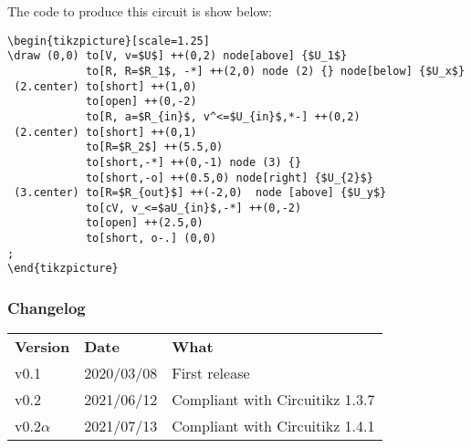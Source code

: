 \documentclass[12pt]{article}
\begin{document}
The code to produce this circuit is show below:

\begin{lstlisting}
\begin{tikzpicture}[scale=1.25]
\draw (0,0) to[V, v=$U$] ++(0,2) node[above] {$U_1$}
            to[R, R=$R_1$, -*] ++(2,0) node (2) {} node[below] {$U_x$}
 (2.center) to[short] ++(1,0)
            to[open] ++(0,-2)
            to[R, a=$R_{in}$, v^<=$U_{in}$,*-] ++(0,2) 
 (2.center) to[short] ++(0,1)
            to[R=$R_2$] ++(5.5,0)
            to[short,-*] ++(0,-1) node (3) {}
			to[short,-o] ++(0.5,0) node[right] {$U_{2}$}
 (3.center) to[R=$R_{out}$] ++(-2,0)  node [above] {$U_y$}
            to[cV, v_<=$aU_{in}$,-*] ++(0,-2)
			to[open] ++(2.5,0)
            to[short, o-.] (0,0)
;
\end{tikzpicture}
\end{lstlisting}
\subsubsection*{Changelog}

\begin{table}[!ht]
\begin{tabular}{lll}
\textbf{Version} & \textbf{Date} & \textbf{What} \\
v0.1    & 2020/03/08 & First release\\
v0.2    & 2021/06/12 & Compliant with Circuitikz 1.3.7\\
v0.2$\alpha$  & 2021/07/13 & Compliant with Circuitikz 1.4.1
\end{tabular}
\end{table}
\end{document}
